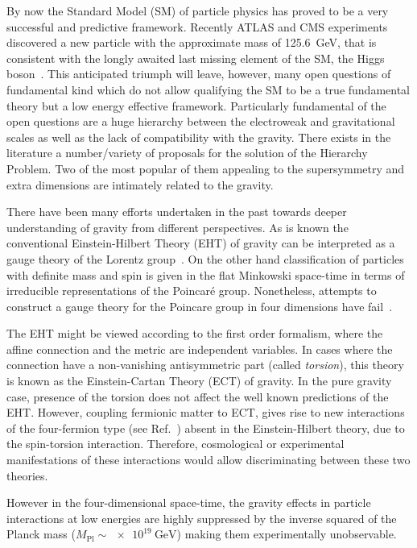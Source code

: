 \documentclass[twocolumn,showpacs,showkeys,prd,superscriptaddress]{revtex4-1}
\begin{document}
By now the Standard Model (SM) of particle physics has proved to be a very successful and predictive framework. Recently ATLAS and CMS experiments discovered a new particle with the approximate mass of \SI{125.6}{\GeV}, that is consistent with the longly awaited last missing element of the SM, the Higgs boson~\cite{Aad:2012tfa,Chatrchyan:2012ufa}.
This anticipated triumph will leave, however, many open questions of fundamental kind which do not allow qualifying the SM to be a true fundamental theory but a low energy effective framework. Particularly fundamental of the open questions are a huge hierarchy between the electroweak and gravitational scales as well as the lack of compatibility with the gravity.  There exists in the literature a number/variety of  proposals for the solution of the Hierarchy Problem.  Two of the  most popular of them appealing to the supersymmetry and extra dimensions  are intimately related to the gravity.

There have been many efforts undertaken in the past towards deeper understanding of gravity from different perspectives. As is known the conventional Einstein-Hilbert Theory (EHT)  of gravity can be interpreted as a gauge theory of the Lorentz group~\cite{PhysRev.101.1597}.
On the other hand  classification of particles with definite mass and spin is given in  the flat Minkowski space-time  in terms of irreducible representations of the Poincar\'e group. Nonetheless, attempts to  construct a gauge theory for the Poincare group in four dimensions have fail~\cite{Kibble:1961ba,PhysRevLett.33.445,PhysRevD.13.3192,PhysRevLett.38.739}.


The EHT might be viewed according to the first order formalism, where the affine connection and the metric are independent variables.  In  cases where the connection  have a non-vanishing antisymmetric part (called \textit{torsion}), this theory is known as the Einstein-Cartan Theory (ECT) of gravity. In the pure gravity case, presence of the torsion does not affect the well known predictions of the EHT. However, coupling fermionic matter to ECT, gives rise to new interactions of the four-fermion type  (see Ref.~\cite{Kibble:1961ba}) absent in the Einstein-Hilbert theory, due to the spin-torsion interaction. Therefore, cosmological or experimental manifestations of these interactions would allow discriminating between these two theories.

However in the four-dimensional space-time,  the gravity effects in particle interactions at low energies are highly suppressed by the inverse squared of the  Planck mass ($M_{\text{Pl}}\sim\SI{e19}{\GeV}$) making them experimentally unobservable. 
\end{document}

